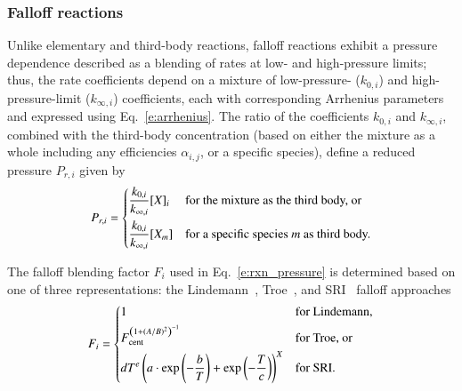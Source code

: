 \documentclass[preprint,12pt]{elsarticle}
\begin{document}
\subsubsection{Falloff reactions}

Unlike elementary and third-body reactions, falloff reactions exhibit a pressure dependence described as a blending of rates at low- and high-pressure limits; thus, the rate coefficients depend on a mixture of low-pressure- ($k_{0, i}$) and high-pressure-limit ($k_{\infty,i}$) coefficients, each with corresponding Arrhenius parameters and expressed using Eq.~\eqref{e:arrhenius}.
The ratio of the coefficients $k_{0, i}$ and $k_{\infty, i}$, combined with the third-body concentration (based on either the mixture as a whole including any efficiencies $\alpha_{i,j}$, or a specific species), define a reduced pressure $P_{r,i}$ given by
\begin{equation}
P_{r,i} = \begin{dcases}
\frac{k_{0,i}}{k_{\infty,i}} [X]_i &\text{for the mixture as the third body, or} \\
\frac{k_{0,i}}{k_{\infty,i}} [X_m] &\text{for a specific species } m \text{ as third body.}
\end{dcases}
\label{e:pr_i}
\end{equation}

The falloff blending factor $F_i$ used in Eq.~\eqref{e:rxn_pressure} is determined based on one of three representations: the Lindemann~\cite{Lindemann:1922cz}, Troe~\cite{Gilbert:1983bb}, and SRI~\cite{Stewart:1989gj} falloff approaches
\begin{equation}
F_i = \begin{dcases}
1 &\text{for Lindemann,} \\
F_{\text{cent}}^{ \left( 1 + ( A / B )^2 \right)^{-1} } &\text{for Troe, or} \\
d T^e \left( a \cdot \exp \left( -\frac{b}{T} \right) + \exp \left( -\frac{T}{c} \right) \right)^X &\text{for SRI.}
\end{dcases}
\end{equation}
\end{document}
